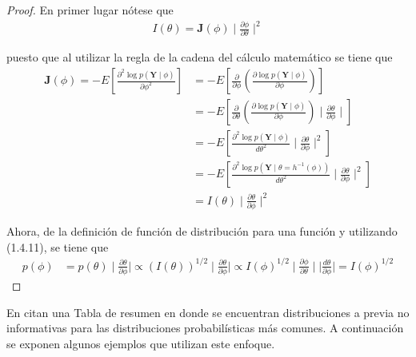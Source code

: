 \documentclass[10pt,openright]{book}\usepackage[]{graphicx}\usepackage[]{color}
\begin{document}
\begin{proof}
En primer lugar nótese que
\begin{align*}
I(\theta)=\mathbf{J}(\phi) \mid \frac{\partial\phi}{\partial\theta} \mid ^{2}
\end{align*}

puesto que al utilizar la regla de la cadena del cálculo matemático se tiene que
\begin{align*}
\mathbf{J}(\phi)= - E\left[\frac{\partial^2 \log p(\mathbf{Y} \mid \phi)}{\partial\phi^2}\right]
&= - E\left[\frac{\partial}{\partial\phi}\left(\frac{\partial \log p(\mathbf{Y} \mid \phi)}{\partial\phi}\right)\right]\\
&= - E\left[\frac{\partial}{\partial\theta}\left(\frac{\partial \log p(\mathbf{Y} \mid \phi)}{\partial\phi}\right) \mid \frac{\partial\theta}{\partial\phi} \mid \right]\\
&= - E\left[\frac{\partial^2 \log p(\mathbf{Y} \mid \phi)}{d\theta^2} \mid \frac{\partial\theta}{\partial\phi} \mid ^{2}\right]\\
&= - E\left[\frac{\partial^2 \log p(\mathbf{Y} \mid \theta =h^{-1}(\phi))}{d\theta^2} \mid \frac{\partial\theta}{\partial\phi} \mid ^{2}\right]\\
&= I(\theta) \mid \frac{\partial\theta}{\partial\phi} \mid ^{2}
\end{align*}

Ahora, de la definición de función de distribución para una función y utilizando (1.4.11), se tiene que
\begin{align*}
p(\phi)&=p(\theta) \mid \frac{\partial\theta}{\partial\phi} \mid
\propto (I(\theta))^{1/2} \mid \frac{\partial\theta}{\partial\phi} \mid
\propto I(\phi)^{1/2} \mid \frac{\partial\phi}{\partial\theta} \mid  \mid \frac{d\theta}{\partial\phi} \mid =I(\phi)^{1/2}
\end{align*}
\end{proof}

En  citan una Tabla de resumen en donde se encuentran distribuciones a previa no informativas para las distribuciones probabilísticas más comunes. A continuación se exponen algunos ejemplos que utilizan este enfoque.
\end{document}
